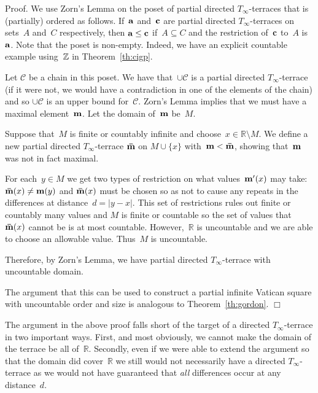 \documentclass[12pt,a4paper]{article}
\newcommand{\Z}{\mathbb{Z}}
\newcommand{\R}{\mathbb{R}}
\newcommand{\qed}{\unskip\protect\nolinebreak\mbox{\quad$\Box$}\vspace{3mm}}
\begin{document}
\noindent
Proof.  We use Zorn's Lemma on the poset of partial directed $T_{\infty}$-terraces that is (partially) ordered as follows.  If~${\bf a}$ and~${\bf c}$ are partial  directed $T_{\infty}$-terraces on sets~$A$ and~$C$ respectively, then ${\bf a} \leq {\bf c}$ if~$A \subseteq C$ and the restriction of~${\bf c}$ to~$A$ is~${\bf a}$.  Note that the poset is non-empty.  Indeed, we have an explicit countable example using~${\bf \Z}$ in Theorem~\ref{th:cigp}.

Let $\mathcal{C}$ be a chain in this poset.   We have that~$\cup \mathcal{C}$ is a partial directed $T_{\infty}$-terrace (if it were not, we would have a contradiction in one of the elements of the chain) and so $\cup \mathcal{C}$  is an upper bound for~$\mathcal{C}$.  Zorn's Lemma implies that we must have a maximal element~${\bf m}$.  Let the domain of~${\bf m}$ be~$M$.

Suppose that~$M$ is finite or countably infinite and choose~$x \in \R \setminus M$.  We define a new partial directed $T_{\infty}$-terrace ${\bf \bar{m}}$ on $M \cup \{ x \}$ with~${\bf m} < {\bf \bar{m}}$, showing that~${\bf m}$ was not in fact maximal.

For each~$y \in M$ we get two types of restriction on what values~${\bf m'}(x)$ may take: ${\bf \bar{m}}(x) \neq {\bf m}(y)$ and  ${\bf \bar{m}}(x)$ must be chosen so as not to cause any repeats in the differences at distance~$d = |y-x|$.   This set of restrictions rules out finite or countably many values and $M$ is finite or countable so the set of values that ${\bf \bar{m}}(x)$ cannot be is at most countable.  However,~$\R$ is uncountable and we are able to choose an allowable value.  Thus~$M$ is uncountable.

Therefore, by Zorn's Lemma, we have  partial directed $T_{\infty}$-terrace with uncountable domain.

The argument that this can be used to construct a partial infinite Vatican square with uncountable order and size is analogous to Theorem~\ref{th:gordon}.
\qed

The argument in the above proof falls short of the target of a directed $T_{\infty}$-terrace in two important ways.  First, and most obviously, we cannot make the domain of the terrace be all of~$\R$.  Secondly, even if we were able to extend the argument so that the domain did cover~$\R$ we still would not necessarily have a 
directed $T_{\infty}$-terrace as we would not have guaranteed that {\em all} differences occur at any distance~$d$.
\end{document}
